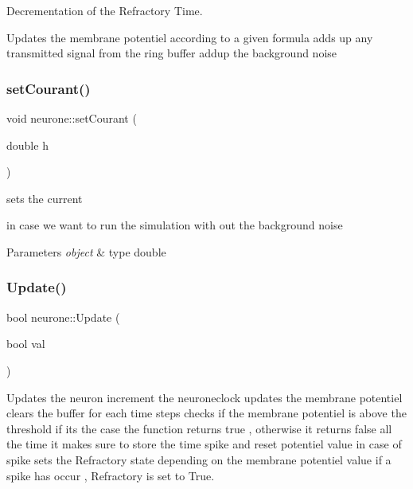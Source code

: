 Decrementation of the Refractory Time. 

Updates the membrane potentiel according to a given formula add\textquotesingle{}s up any transmitted signal from the ring buffer add\textquotesingle{}up the background noise \mbox{\label{classneurone_aee16c91befdb31b71067f7e800053d46}} 
\subsubsection{\texorpdfstring{set\+Courant()}{setCourant()}}
{\footnotesize\ttfamily void neurone\+::set\+Courant (\begin{DoxyParamCaption}\item[{double}]{h }\end{DoxyParamCaption})}



sets the current 

in case we want to run the simulation with out the background noise


\begin{DoxyParams}{Parameters}
{\em object} & type double \\
\hline
\end{DoxyParams}
\mbox{\label{classneurone_aa979624b96f5489a952e4ce0457ffdbc}} 
\subsubsection{\texorpdfstring{Update()}{Update()}}
{\footnotesize\ttfamily bool neurone\+::\+Update (\begin{DoxyParamCaption}\item[{bool}]{val }\end{DoxyParamCaption})}



Updates the neuron increment the neuroneclock updates the membrane potentiel clears the buffer for each time steps checks if the membrane potentiel is above the threshold if it\textquotesingle{}s the case the function returns true , otherwise it returns false all the time it makes sure to store the time spike and reset potentiel value in case of spike sets the Refractory state depending on the membrane potentiel value if a spike has occur , Refractory is set to True. 


